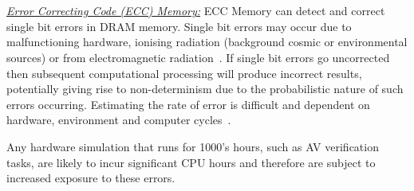 \documentclass[letterpaper, 10 pt, journal, twoside]{IEEEtran}
\begin{document}
%
\\\\
\noindent\underline{\textit{Error Correcting Code (ECC) Memory:}}
ECC Memory can detect and correct single bit errors in DRAM memory. Single bit errors may occur due to malfunctioning hardware, ionising radiation (background cosmic or environmental sources) or from electromagnetic radiation~\cite{dodd2003basic}. If single bit errors go uncorrected then subsequent computational processing will produce incorrect results, potentially giving rise to non-determinism due to the probabilistic nature of such errors occurring. Estimating the rate of error is difficult and dependent on hardware, environment and computer cycles~\cite{mielke2008bit}. 

Any hardware simulation that runs for 1000's hours, such as AV verification tasks, are likely to incur significant CPU hours and therefore are subject to increased exposure to these errors.
\end{document}
